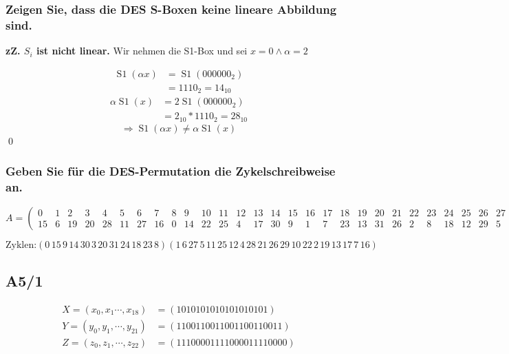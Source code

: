 \subsubsection{Zeigen Sie, dass die DES S-Boxen keine lineare Abbildung sind.}

\textbf{zZ. $S_i$ ist nicht linear.} 
Wir nehmen die S1-Box und sei $x = 0 \wedge \alpha = 2$ 

\begin{align}
 \operatorname*{S1}(\alpha x) &=  \operatorname*{S1}(000000_2)      \\
				              &= 1110_2  = 14_{10}                  
\end{align}
\begin{align}
  \alpha  \operatorname*{S1}(x) &= 2 \operatorname*{S1}(000000_2)  \\
				 &= 2_{10} * 1110_2 = 28_{10}
\end{align}
\begin{equation}
\Rightarrow 	\operatorname*{S1}(\alpha x) \ne \alpha \operatorname*{S1}(x)			
\end{equation}
\qed

\subsubsection{Geben Sie für die DES-Permutation die Zykelschreibweise an.}
\begin{equation}
A = \left (\begin{array}{*{32}{r}}
0&1&2&3&4&5&6&7&8&9&10&11&12&13&14&15&16&17&18&19&20&21&22&23&24&25&26&27&28&29&30&31	\\
15&6&19&20&28&11&27&16&0&14&22&25&4&17&30&9&1&7&23&13&31&26&2&8&18&12&29&5&21&10&3&24
\end{array}\right )
\end{equation}
	
\begin{equation}
\text{Zyklen:}  
(0\,15\,9\,14\,30\,3\,20\,31\,24\,18\,23\,8)
(1\,6\,27\,5\,11\,25\,12\,4\,28\,21\,26\,29\,10\,22\,2\,19\,13\,17\,7\,16)
\end{equation}												

\subsection{A5/1}
\begin{align}
X = (x_0, x_1 \cdots , x_{18}) &= (1010101010101010101)    \\
Y = (y_0, y_1, \cdots , y_{21}) &= (1100110011001100110011) \\
Z = (z_0, z_1, \cdots , z_{22}) &= (11100001111000011110000)
\end{align}

